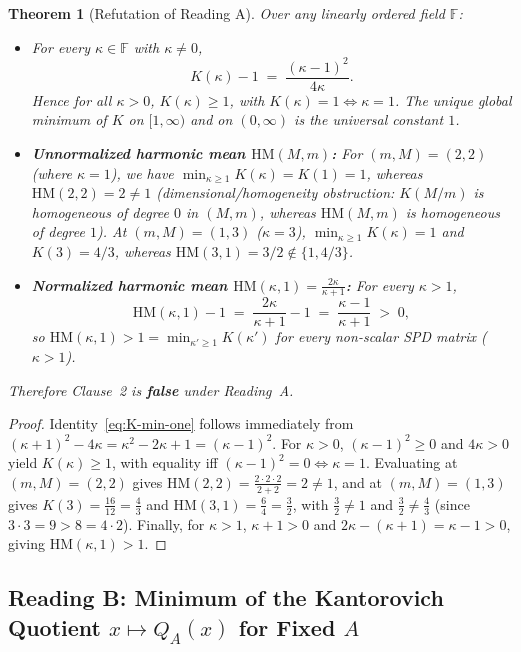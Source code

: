 \documentclass[11pt,a4paper]{article}
\newtheorem{theorem}{Theorem}[section]
\theoremstyle{definition}
\newcommand{\HM}{\mathrm{HM}}
\begin{document}
\begin{theorem}[Refutation of Reading A]
\label{thm:readingA}
Over any linearly ordered field $\mathbb{F}$:
\begin{itemize}
  \item[(i)] For every $\kappa \in \mathbb{F}$ with $\kappa \ne 0$,
  \begin{equation}
    \label{eq:K-min-one}
    K(\kappa) - 1 \;=\; \frac{(\kappa - 1)^2}{4\kappa}.
  \end{equation}
  Hence for all $\kappa > 0$, $K(\kappa) \ge 1$, with $K(\kappa) = 1 \iff \kappa = 1$.
  The unique global minimum of $K$ on $[1, \infty)$ and on $(0, \infty)$ is the
  universal constant $1$.
  \item[(ii)] \textbf{Unnormalized harmonic mean $\HM(M,m)$:} For $(m, M) = (2, 2)$
  (where $\kappa = 1$), we have $\min_{\kappa \ge 1} K(\kappa) = K(1) = 1$, whereas
  $\HM(2, 2) = 2 \ne 1$ (dimensional/homogeneity obstruction: $K(M/m)$ is
  homogeneous of degree $0$ in $(M,m)$, whereas $\HM(M,m)$ is homogeneous of
  degree $1$). At $(m, M) = (1, 3)$ ($\kappa = 3$), $\min_{\kappa \ge 1} K(\kappa) = 1$
  and $K(3) = 4/3$, whereas $\HM(3, 1) = 3/2 \notin \{1, 4/3\}$.
  \item[(iii)] \textbf{Normalized harmonic mean $\HM(\kappa, 1) = \frac{2\kappa}{\kappa + 1}$:}
  For every $\kappa > 1$,
  \[
    \HM(\kappa, 1) - 1 \;=\; \frac{2\kappa}{\kappa + 1} - 1
    \;=\; \frac{\kappa - 1}{\kappa + 1} \;>\; 0,
  \]
  so $\HM(\kappa, 1) > 1 = \min_{\kappa' \ge 1} K(\kappa')$ for every
  non-scalar SPD matrix ($\kappa > 1$).
\end{itemize}
Therefore Clause~2 is \textbf{false} under Reading~A.
\end{theorem}
\begin{proof}
Identity~\eqref{eq:K-min-one} follows immediately from
$(\kappa + 1)^2 - 4\kappa = \kappa^2 - 2\kappa + 1 = (\kappa - 1)^2$. For
$\kappa > 0$, $(\kappa - 1)^2 \ge 0$ and $4\kappa > 0$ yield $K(\kappa) \ge 1$,
with equality iff $(\kappa - 1)^2 = 0 \iff \kappa = 1$. Evaluating at
$(m, M) = (2, 2)$ gives $\HM(2,2) = \frac{2\cdot 2\cdot 2}{2+2} = 2 \ne 1$, and
at $(m, M) = (1, 3)$ gives $K(3) = \frac{16}{12} = \frac{4}{3}$ and
$\HM(3,1) = \frac{6}{4} = \frac{3}{2}$, with $\frac{3}{2} \ne 1$ and
$\frac{3}{2} \ne \frac{4}{3}$ (since $3\cdot 3 = 9 > 8 = 4\cdot 2$). Finally,
for $\kappa > 1$, $\kappa + 1 > 0$ and $2\kappa - (\kappa + 1) = \kappa - 1 > 0$,
giving $\HM(\kappa, 1) > 1$.
\end{proof}

\subsection{Reading B: Minimum of the Kantorovich Quotient \texorpdfstring{$x \mapsto Q_A(x)$}{x |-> Q\_A(x)} for Fixed \texorpdfstring{$A$}{A}}
\end{document}

